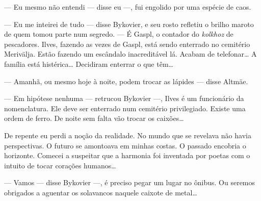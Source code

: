 --- Eu mesmo não entendi --- disse eu ---, fui engolido por uma espécie
de caos.

--- Eu me inteirei de tudo --- disse Bykovier, e seu rosto refletiu o
brilho maroto de quem tomou parte num segredo. --- É Gaspl, o contador
do \emph{kolkhoz} de pescadores. Ilves, fazendo as vezes de Gaspl, está
sendo enterrado no cemitério Merivälja. Estão fazendo um escândalo
inacreditável lá. Acabam de telefonar\ldots{} A família está histérica\ldots{}
Decidiram enterrar o que têm\ldots{}

--- Amanhã, ou mesmo hoje à noite, podem trocar as lápides --- disse
Altmäe.

--- Em hipótese nenhuma --- retrucou Bykovier ---, Ilves é um
funcionário da nomenclatura. Ele deve ser enterrado num cemitério
privilegiado. Existe uma ordem de ferro. De noite sem falta vão trocar
os caixões\ldots{}

De repente eu perdi a noção da realidade. No mundo que se revelava não
havia perspectivas. O futuro se amontoava em minhas costas. O passado
encobria o horizonte. Comecei a suspeitar que a harmonia foi inventada
por poetas com o intuito de tocar corações humanos\ldots{}

--- Vamos --- disse Bykovier ---, é preciso pegar um lugar no ônibus. Ou
seremos obrigados a aguentar os solavancos naquele caixote de metal\ldots{}

\movetooddpage
\begin{center}
{}
\end{center}

